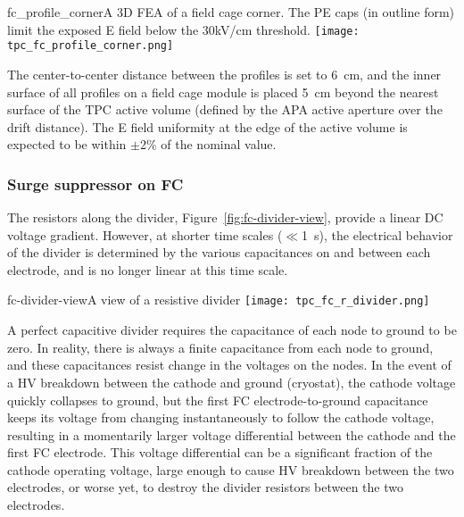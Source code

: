 \begin{cdrfigure}{fc_profile_corner}{A 3D FEA of a field cage corner.  The PE caps (in outline form) limit the exposed E field below the 30kV/cm threshold.}
\texttt{[image: tpc\_fc\_profile\_corner.png]}
\end{cdrfigure}

The center-to-center distance between the profiles is set to 6~cm, and the inner surface of all profiles on a field cage module is placed 5~cm beyond the nearest surface of the TPC active volume (defined by the APA active aperture over the drift distance). The E field uniformity at the edge of the active volume is expected to be within $\pm$2\% of the nominal value.


\subsubsection{Surge suppressor on FC}


The resistors along the divider, Figure~\ref{fig:fc-divider-view}, provide a linear DC voltage gradient. However, at shorter time scales ($\ll$1~s), the electrical behavior of the divider is determined by the various capacitances on and between each electrode, and  is no longer linear at this time scale. 

\begin{cdrfigure}{fc-divider-view}{A view of a resistive divider}
\texttt{[image: tpc\_fc\_r\_divider.png]}
\end{cdrfigure}

A perfect capacitive divider requires the capacitance of each node to ground to be zero.  In reality, there is always a finite capacitance from each node to ground, and these capacitances resist change in the voltages on the nodes. In the event of a HV breakdown between the cathode and ground (cryostat), the cathode voltage quickly collapses to ground, but the first FC electrode-to-ground capacitance keeps its voltage from changing instantaneously to follow the cathode voltage, resulting in a momentarily larger voltage differential between the cathode and the first FC electrode. This voltage differential can be a significant fraction of the cathode operating voltage, large enough to cause HV breakdown between the two electrodes, or worse yet, to destroy the divider resistors between the two electrodes.


